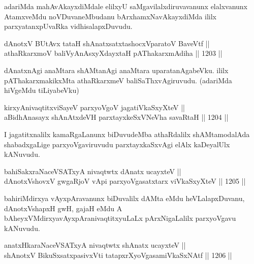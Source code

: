 \begin{artha}
adariMda mahAvAkayxdiMdale elilxyU saMgavilalxdiruvavanunx elalxvanunx AtamxveMdu noVDuvaneMbudanu bArxhamxNavAkayxdiMda ililx parxyatanxpUvaRka vidhisalapxDuvudu.
\end{artha}

\begin{shl}
dAnotxV BUtAvx tataH shAnatxsatxtashocxVparatoV BaveVtf ||  \\
athaRkarxmoV baliVyAnAsxyXdayxtaH pAThakarxmAdiha \hfill || 1203 ||  
\end{shl}


\begin{artha}
dAnatxnAgi anaMtara shAMtanAgi anaMtara uparatanAgabeVku. ililx pAThakarxmakikxMta athaRkarxmeV baliSaThxvAgiruvudu. (adariMda hiVgeMdu tiLiyabeVku)
\end{artha}


\begin{shl}
kirxyAnivaqtitxviSayeV parxyoVgoV jagatiVkaSxyXteV || \\
aBidhAnasayx shAnAtxdeVH parxtayxkeSxVNeVha savaRtaH \hfill || 1204 ||  
\end{shl}

\begin{artha}
I jagatitxnalilx kamaRgaLanunx biDuvudeMba athaRdalilx shAMtamodalAda shabadxgaLige parxyoVgaviruvudu parxtayxkaSxvAgi elAlx kaDeyalUlx kANuvudu.
\end{artha}


\begin{shl}
bahiSakxraNaceVSATxyA nivaqtwtx dAnatx ucayxteV || \\
dAnotxV\s shovxV gwgaRjoV vA\s pi parxyoVgasatxtarx viVkaSxyXteV \hfill || 1205 ||  
\end{shl}

\begin{artha}
bahiriMdirxya vAyxpAravanunx biDuvalilx dAMta eMdu heVLalapxDuvanu, dAnotxV\s shapxH gwH, gajaH eMdu A bAheyxVMdirxyavAyxpAranivaqtitxyuLaLx pArxNigaLalilx parxyoVgavu kANuvudu.
\end{artha}


\begin{shl}
anatxHkaraNaceVSATxyA nivaqtwtx shAnatx ucayxteV || \\
shAnotxV BikuSxsatxpasivxVti tatapxrXyoVgasamiVkaSxNAtf \hfill || 1206 ||  
\end{shl}

